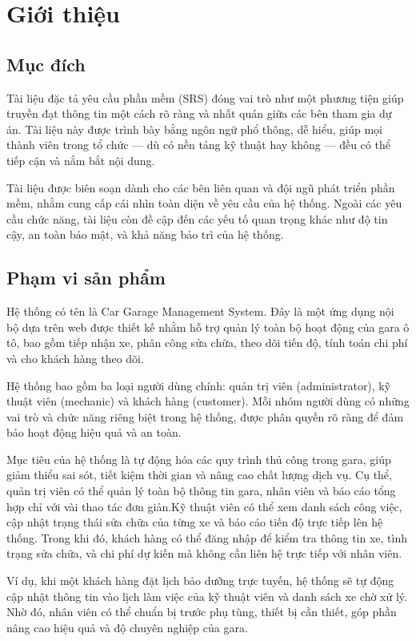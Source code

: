 \documentclass[../main.tex]{subfiles}
\begin{document}
\chapter{Giới thiệu}

\section{Mục đích}
Tài liệu đặc tả yêu cầu phần mềm (SRS) đóng vai trò như một phương tiện giúp truyền đạt thông tin một cách rõ ràng và nhất quán giữa các bên tham gia dự án. Tài liệu này được trình bày bằng ngôn ngữ phổ thông, dễ hiểu, giúp mọi thành viên trong tổ chức — dù có nền tảng kỹ thuật hay không — đều có thể tiếp cận và nắm bắt nội dung.

Tài liệu được biên soạn dành cho các bên liên quan và đội ngũ phát triển phần mềm, nhằm cung cấp cái nhìn toàn diện về yêu cầu của hệ thống. Ngoài các yêu cầu chức năng, tài liệu còn đề cập đến các yếu tố quan trọng khác như độ tin cậy, an toàn bảo mật, và khả năng bảo trì của hệ thống.

\section{Phạm vi sản phẩm}
Hệ thống có tên là Car Garage Management System. Đây là một ứng dụng nội bộ dựa trên web được thiết kế nhằm hỗ trợ quản lý toàn bộ hoạt động của gara ô tô, bao gồm tiếp nhận xe, phân công sửa chữa, theo dõi tiến độ, tính toán chi phí và cho khách hàng theo dõi.

Hệ thống bao gồm ba loại người dùng chính: quản trị viên (administrator), kỹ thuật viên (mechanic) và khách hàng (customer). Mỗi nhóm người dùng có những vai trò và chức năng riêng biệt trong hệ thống, được phân quyền rõ ràng để đảm bảo hoạt động hiệu quả và an toàn.

Mục tiêu của hệ thống là tự động hóa các quy trình thủ công trong gara, giúp giảm thiểu sai sót, tiết kiệm thời gian và nâng cao chất lượng dịch vụ. Cụ thể, quản trị viên có thể quản lý toàn bộ thông tin gara, nhân viên và báo cáo tổng hợp chỉ với vài thao tác đơn giản.Kỹ thuật viên có thể xem danh sách công việc, cập nhật trạng thái sửa chữa của từng xe và báo cáo tiến độ trực tiếp lên hệ thống. Trong khi đó, khách hàng có thể đăng nhập để kiểm tra thông tin xe, tình trạng sửa chữa, và chi phí dự kiến mà không cần liên hệ trực tiếp với nhân viên.

Ví dụ, khi một khách hàng đặt lịch bảo dưỡng trực tuyến, hệ thống sẽ tự động cập nhật thông tin vào lịch làm việc của kỹ thuật viên và danh sách xe chờ xử lý. Nhờ đó, nhân viên có thể chuẩn bị trước phụ tùng, thiết bị cần thiết, góp phần nâng cao hiệu quả và độ chuyên nghiệp của gara.
\end{document}
